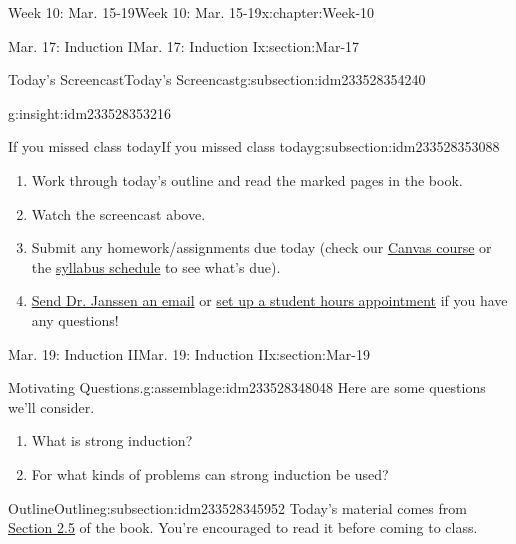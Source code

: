 \documentclass[oneside,10pt,]{book}
\numberwithin{equation}{section}
\begin{document}
\begin{chapterptx}{Week 10: Mar. 15-19}{}{Week 10: Mar. 15-19}{}{}{x:chapter:Week-10}
\begin{sectionptx}{Mar. 17: Induction I}{}{Mar. 17: Induction I}{}{}{x:section:Mar-17}
\begin{subsectionptx}{Today's Screencast}{}{Today's Screencast}{}{}{g:subsection:idm233528354240}
\begin{insight}{}{g:insight:idm233528353216}
\end{insight}
\end{subsectionptx}
%
%
\typeout{************************************************}
\typeout{************************************************}
%
\begin{subsectionptx}{If you missed class today}{}{If you missed class today}{}{}{g:subsection:idm233528353088}
%
\begin{enumerate}
\item{}Work through today's outline and read the marked pages in the book.%
\item{}Watch the screencast above.%
\item{}Submit any homework\slash{}assignments due today (check our \href{https://dordt.instructure.com/courses/3110050}{Canvas course} or the \href{https://prof.mkjanssen.org/ds/index.html\#schedule}{syllabus schedule} to see what's due).%
\item{}\href{mailto:mike.janssen@dordt.edu}{Send Dr. Janssen an email} or \href{https://calendly.com/mkjanssen/student-hours}{set up a student hours appointment} if you have any questions!%
\end{enumerate}
\end{subsectionptx}
\end{sectionptx}
%
%
\typeout{************************************************}
\typeout{************************************************}
%
\begin{sectionptx}{Mar. 19: Induction II}{}{Mar. 19: Induction II}{}{}{x:section:Mar-19}
\begin{introduction}{}%
\begin{assemblage}{Motivating Questions.}{g:assemblage:idm233528348048}%
Here are some questions we'll consider. %
\begin{enumerate}
\item{}What is strong induction?%
\item{}For what kinds of problems can strong induction be used?%
\end{enumerate}
%
\end{assemblage}
\end{introduction}%
%
%
\typeout{************************************************}
\typeout{************************************************}
%
\begin{subsectionptx}{Outline}{}{Outline}{}{}{g:subsection:idm233528345952}
Today's material comes from \href{http://discrete.openmathbooks.org/dmoi3/sec_seq-induction.html}{Section 2.5} of the book. You're encouraged to read it before coming to class.%

\end{subsectionptx}
\end{sectionptx}
\end{chapterptx}
\end{document}
